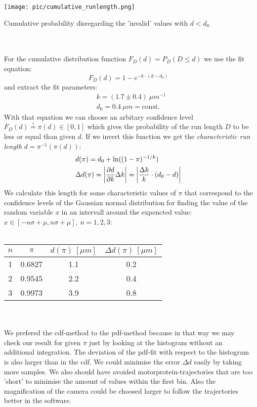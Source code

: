     	 \minipanf
    	     	     \centering
    	     	     \captionsetup{justification=centering}            
    	     	         \texttt{[image: pic/cumulative\_runlength.png]}
    	     	     \caption{Cumulative probability disregarding the 'invalid' values with $d < d_0$}
    	    			 \label{exp:cumuRunLength}             
    	 \minipend\\
    	 \ \\
    	 For the cumulative distribution function $F_D(d) = P_D(D \leq d)$ we use the fit equation:\\
    	 \begin{equation*}
    	     	 	F_D(d) = 1- e^{-k\cdot(d-d_0)}
    	 \end{equation*}
    	 and extract the fit parameters:
    	 \begin{align*}
    	     	  	&k = (1.7 \pm 0.4)\ \unit{\mu m^{-1}}\\
    	     	  	&d_0 = 0.4\ \unit{\mu m}= \mathrm{const.}
    	 \end{align*}
    	With that equation we can choose an arbitary confidence level $F_D(d)\overset{!}{=}\pi(d) \in [0,1]$ which gives the probability of the run length $D$ to be less or equal than given $d$. If we invert this function we get the \textit{characteristic run length} $d = \pi^{-1}(\pi(d))$:
    	\begin{align*}
    			&d(\pi) = d_0 + \ln((1-\pi)^{-1/k})\\
    			&\Delta d(\pi) = \left\vert\frac{\partial d}{\partial k}\Delta k\right\vert = \left\vert\frac{\Delta k}{k}\cdot(d_0 - d)\right\vert 
    	\end{align*}
    	We calculate this length for some characteristic values of $\pi$ that correspond to the confidence levels of the Gaussian normal distribution for finding the value of the random variable $x$ in an intervall around the expencted value:  $x \in [-n\sigma + \mu, n\sigma + \mu],\ n=1,2,3$:\\
    	\ \\
    	\minipanf
    		\centering
    		\begin{tabular}{c|c|c|c}
    	 	       $n$ & $\pi$ & $d(\pi)\ [\unit{\mu m}]$  & $\Delta d(\pi)\ [\unit{\mu m}]$\\
    	 	 \hline		1	& 	0.6827	&	1.1 	& 	0.2\\
    	  				2	&	0.9545	&	2.2		&	0.4\\
    	  				3	&	0.9973	&	3.9		& 	0.8	
    		\end{tabular}
    	\minipend\\
    	\ \\
    	We prefered the cdf-method to the pdf-method because in that way we may check our result for given $\pi$ just by looking at the histogram without an additional integration. The deviation of the pdf-fit with respect to the histogram is also larger than in the cdf. We could minimise the error $\Delta d$ easily by taking more samples. We also should have avoided motorprotein-trajectories that are too 'short' to minimise the amount of values within the first bin. Also the magnification of the camera could be choosed larger to follow the trajectories better in the software.